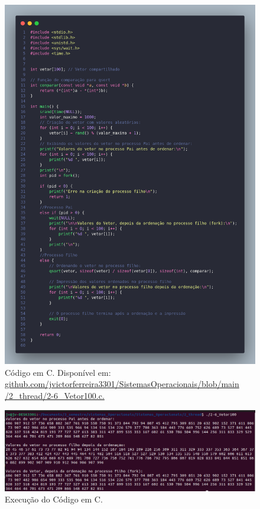 \documentclass[
	12pt,				%
	openright,			%
	oneside,			%
	a4paper,			%
	chapter=TITLE,		%
	english,			%
	french,				%
	spanish,			%
	brazil				%
	]{abntex2}
\theoremstyle{definition}
\begin{document}
\begin{figure}
    \centering
    \includegraphics[width=0.8 \textwidth]{imagens/processos_6.png}
    \caption{Código em C. Disponível em: \href{https://github.com/jvictorferreira3301/Sistemas_Operacionais/blob/main/2_thread/2-6_Vetor100.c}{github.com/jvictorferreira3301/SistemasOperacionais/blob/main
    /2\_thread/2-6\_Vetor100.c.}}
    \label{fig:proc6}
\end{figure}

\begin{figure}
    \centering
    \includegraphics[width=1.0 \textwidth]{imagens/run_processos_6.png}
    \caption{Execução do Código em C.}
    \label{fig:run6}
\end{figure}
\end{document}
